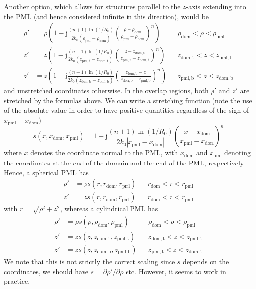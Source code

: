 \documentclass[a4paper,12pt]{article}
\newcommand{\mrm}[1]{\mathrm{#1}}
\newcommand{\ju}{\mrm{j}}
\begin{document}
Another option, which allows for structures parallel to the $z$-axis
extending into the PML (and hence considered infinite in this
direction), would be
\begin{align}
  \rho' &= \rho\left( 1 - \ju \frac{(n+1)\ln(1/R_{0})}{2k_{0}(\rho_{\mrm{pml}} - \rho_{\mrm{dom}})} \left(\frac{\rho-\rho_{\mrm{dom}}}{\rho_{\mrm{pml}} - \rho_{\mrm{dom}}}\right)^{n}\right) && \rho_{\mrm{dom}} < \rho < \rho_{\mrm{pml}} \\
  z' &= z\left( 1 - \ju \frac{(n+1)\ln(1/R_{0})}{2k_{0}(z_{\mrm{pml,t}} - z_{\mrm{dom,t}})} \left(\frac{z-z_{\mrm{dom,t}}}{z_{\mrm{pml,t}} - z_{\mrm{dom,t}}}\right)^{n}\right) && z_{\mrm{dom,t}} < z < z_{\mrm{pml,t}} \\
  z' &= z\left( 1 - \ju \frac{(n+1)\ln(1/R_{0})}{2k_{0}(z_{\mrm{dom,b}} - z_{\mrm{pml,b}})} \left(\frac{z_{\mrm{dom,b}}-z}{z_{\mrm{dom,b}} - z_{\mrm{pml,b}}}\right)^{n}\right) && z_{\mrm{pml,b}} < z < z_{\mrm{dom,b}} 
\end{align}
and unstretched coordinates otherwise. In the overlap regions, both
$\rho'$ and $z'$ are stretched by the formulas above. We can write a
stretching function (note the use of the absolute value in order to
have positive quantities regardless of the sign of
$x_{\mrm{pml}}-x_{\mrm{dom}}$)
\begin{equation}
  s(x,x_{\mrm{dom}},x_{\mrm{pml}}) = 1 - \ju\frac{(n+1)\ln(1/R_{0})}{2k_{0}|x_{\mrm{pml}} - x_{\mrm{dom}}|} \left(\frac{x-x_{\mrm{dom}}}{x_{\mrm{pml}} - x_{\mrm{dom}}}\right)^{n}
\end{equation}
where $x$ denotes the coordinate normal to the PML, with
$x_{\mrm{dom}}$ and $x_{\mrm{pml}}$ denoting the coordinates at the
end of the domain and the end of the PML, respectively. Hence, a
spherical PML has
\begin{align}
  \rho' &= \rho s(r,r_{\mrm{dom}},r_{\mrm{pml}}) && r_{\mrm{dom}} < r < r_{\mrm{pml}} \\
  z' &= z s(r,r_{\mrm{dom}},r_{\mrm{pml}}) && r_{\mrm{dom}} < r < r_{\mrm{pml}}
\end{align}
with $r = \sqrt{\rho^{2} + z^{2}}$, whereas a cylindrical PML has
\begin{align}
  \rho' &= \rho s(\rho,\rho_{\mrm{dom}},\rho_{\mrm{pml}}) && \rho_{\mrm{dom}} < \rho < \rho_{\mrm{pml}} \\
  z' &= z s(z,z_{\mrm{dom,t}},z_{\mrm{pml,t}}) && z_{\mrm{dom,t}} < z < z_{\mrm{pml,t}} \\
  z' &= z s(z,z_{\mrm{dom,b}},z_{\mrm{pml,b}}) && z_{\mrm{pml,t}} < z < z_{\mrm{dom,t}} 
\end{align}
We note that this is not strictly the correct scaling since $s$
depends on the coordinates, we should have
$s=\partial \rho'/\partial\rho$ etc. However, it seems to work in
practice.
\end{document}
